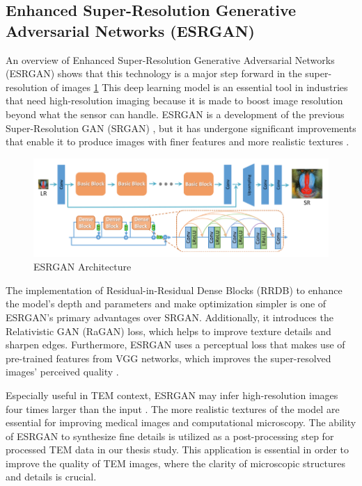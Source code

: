 \clearpage
\subsection{Enhanced Super-Resolution Generative Adversarial Networks (ESRGAN)}

An overview of Enhanced Super-Resolution Generative Adversarial Networks (ESRGAN) \cite{Xintao2018} shows that this technology is a major step forward in the super-resolution of images \ref{fig:ESRGAN Architecture} This deep learning model is an essential tool in industries that need high-resolution imaging because it is made to boost image resolution beyond what the sensor can handle. ESRGAN is a development of the previous Super-Resolution GAN (SRGAN) \cite{Ledig2017}, but it has undergone significant improvements that enable it to produce images with finer features and more realistic textures \cite{Blau2018}.



\begin{figure}[thbp]
\centering
\includegraphics[width=1\textwidth]{img/ESRGAN.png}
\caption{ESRGAN Architecture \cite{Xintao2018}}\label{fig:ESRGAN Architecture}
\end{figure}



The implementation of Residual-in-Residual Dense Blocks (RRDB) to enhance the model's depth and parameters and make optimization simpler is one of ESRGAN's primary advantages over SRGAN. Additionally, it introduces the Relativistic GAN (RaGAN) loss, which helps to improve texture details and sharpen edges. Furthermore, ESRGAN uses a perceptual loss that makes use of pre-trained features from VGG networks, which improves the super-resolved images' perceived quality \cite{Xintao2018}.

\vspace{10pt}
Especially useful in TEM context, ESRGAN may infer high-resolution images four times larger than the input \cite{Xintao2018}. The more realistic textures of the model are essential for improving medical images and computational microscopy. The ability of ESRGAN to synthesize fine details is utilized as a post-processing step for processed TEM data in our thesis study. This application is essential in order to improve the quality of TEM images, where the clarity of microscopic structures and details is crucial.

